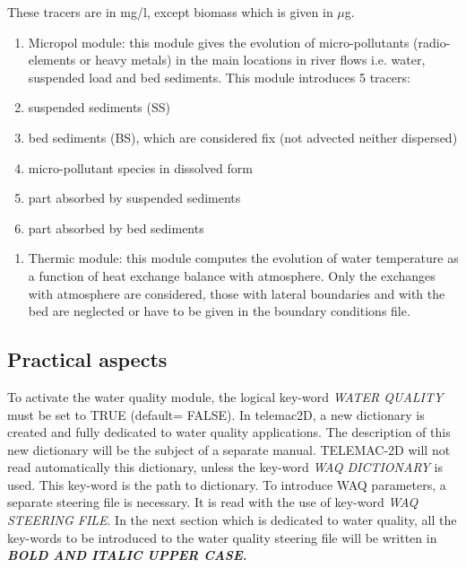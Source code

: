 \documentclass{article} %
\begin{document}
     These tracers are in mg/l, except biomass which is given in $\mu$g.

\begin{enumerate}
\item  Micropol module:  this module gives the evolution of micro-pollutants (radio-elements or heavy metals) in the main locations in river flows i.e. water, suspended load and bed sediments. This module introduces 5 tracers:

\item  suspended sediments (SS)

\item  bed sediments (BS), which are considered fix (not advected neither dispersed)

\item  micro-pollutant species in dissolved form

\item  part absorbed by suspended sediments

\item  part absorbed by bed sediments
\end{enumerate}



\begin{enumerate}
\item  Thermic module: this module computes the evolution of water temperature as a function of heat exchange balance with atmosphere. Only the exchanges with atmosphere are considered, those with lateral boundaries and with the bed are neglected or have to be given in the boundary conditions file.
\end{enumerate}


\subsection{ Practical aspects}



 To activate the water quality module, the logical key-word \textit{WATER QUALITY} must be set to TRUE (default= FALSE).  In telemac2D, a new dictionary is created and fully dedicated to water quality applications. The description of this new dictionary will be the subject of a separate manual. TELEMAC-2D will not read automatically this dictionary, unless the key-word \textit{WAQ DICTIONARY} is used. This key-word is the path to dictionary. To introduce WAQ parameters, a separate steering file is necessary. It is read with the use of key-word \textit{WAQ STEERING FILE}. In the next section which is dedicated to water quality, all the key-words to be introduced to the water quality steering file will be written in \textbf{\textit{BOLD AND ITALIC UPPER CASE.}}
\end{document}
